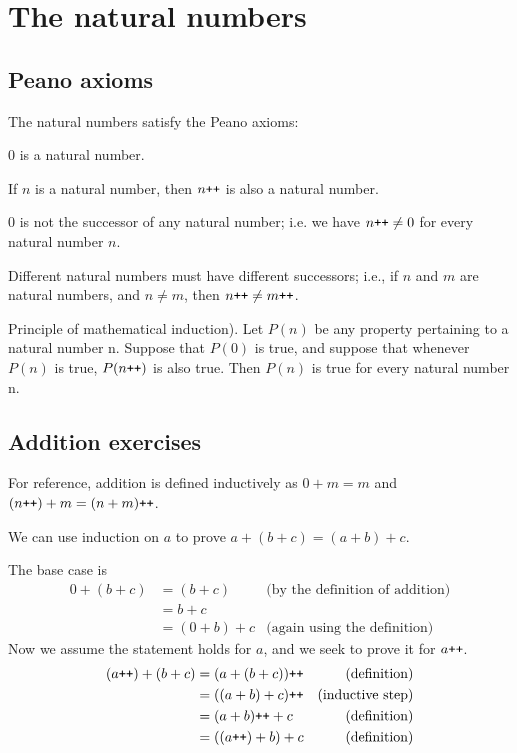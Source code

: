 \section{The natural numbers}
\subsection{Peano axioms}
The natural numbers satisfy the Peano axioms:

\begin{axiom}
  $0$ is a natural number.
\end{axiom}
\begin{axiom}
  If $n$ is a natural number, then $n\texttt{++}$ is also a natural number.
\end{axiom}
\begin{axiom}
  $0$ is not the successor of any natural number; i.e. we have $n\texttt{++} \neq 0$ for every natural number $n$.
\end{axiom}
\begin{axiom}
  Different natural numbers must have different successors; i.e., if $n$ and $m$ are natural numbers, and $n \neq m$, then $n\texttt{++} \neq m\texttt{++}$.
\end{axiom}
\begin{axiom}
  Principle of mathematical induction). Let $P(n)$ be
any property pertaining to a natural number n. Suppose that $P(0)$
is true, and suppose that whenever $P(n)$ is true, $P(n\texttt{++})$ is also
true. Then $P(n)$ is true for every natural number n.
\end{axiom}

\subsection{Addition exercises}
For reference, addition is defined inductively as $0 + m = m$ and $(n\texttt{++}) + m = (n + m)\texttt{++}$.

We can use induction on $a$ to prove $a + (b + c) = (a + b) + c$.

The base case is
\begin{align*}
  0 + (b + c) &= (b + c) &\text{(by the definition of addition)}\\
              &= b + c  & \\
              &= (0 + b) + c &\text{(again using the definition)}
\end{align*}
Now we assume the statement holds for $a$, and we seek to prove it for $a\texttt{++}$.
\begin{align*}
  (a\texttt{++}) + (b+c) &= (a + (b+c))\texttt{++} &\text{(definition)}\\
                &= ((a + b) + c)\texttt{++} &\text{(inductive step)}\\
                &= (a+b)\texttt{++} + c &\text{(definition)}\\
                &= ((a\texttt{++}) + b) + c &\text{(definition)}
\end{align*}

